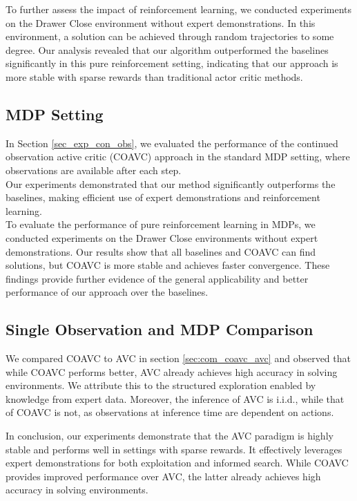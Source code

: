 To further assess the impact of reinforcement learning, we conducted experiments on the Drawer Close environment without expert demonstrations. 
In this environment, a solution can be achieved through random trajectories to some degree. 
Our analysis revealed that our algorithm outperformed the baselines significantly in this pure reinforcement setting, 
indicating that our approach is more stable with sparse rewards than traditional actor critic methods.\\




\subsection{MDP Setting}
In Section \ref{sec_exp_con_obs}, we evaluated the performance of the continued observation active critic (COAVC) approach in the standard MDP setting, 
where observations are available after each step.\\

Our experiments demonstrated that our method significantly outperforms the baselines, making efficient use of expert demonstrations and reinforcement learning.\\

To evaluate the performance of pure reinforcement learning in MDPs, we conducted experiments on the Drawer Close 
environments without expert demonstrations. Our results show that all baselines and COAVC can find solutions, but COAVC is more stable and achieves 
faster convergence. These findings provide further evidence of the general applicability and better performance of our approach over the baselines. 

\subsection{Single Observation and MDP Comparison}
We compared COAVC to AVC in section \ref{sec:com_coavc_avc} and observed that while COAVC performs better, 
AVC already achieves high accuracy in solving environments. We attribute this to the structured exploration enabled by knowledge from 
expert data. Moreover, the inference of AVC is i.i.d., while that of COAVC is not, as observations at inference time are dependent on actions. 

In conclusion, our experiments demonstrate that the AVC paradigm is highly stable and performs well in settings with sparse rewards. 
It effectively leverages expert demonstrations for both exploitation and informed search. While COAVC provides improved performance over 
AVC, the latter already achieves high accuracy in solving environments.

